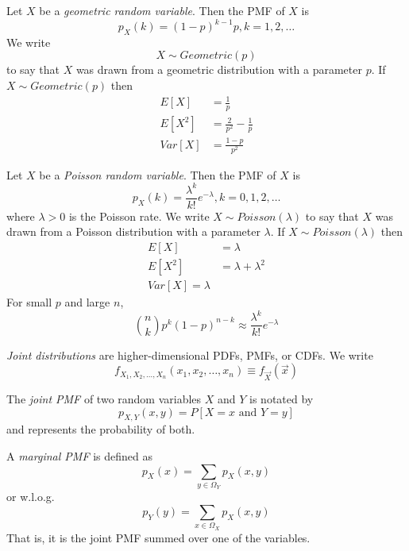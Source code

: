 Let $X$ be a \emph{geometric random variable}. Then the
PMF of $X$ is
\begin{equation}
    p_X(k) = (1 - p)^{k - 1}p, k=1,2,\dots
\end{equation}
We write
\begin{equation}
    X \sim Geometric(p)
\end{equation}
to say that $X$ was drawn from a geometric
distribution with a parameter $p$.
If $X \sim Geometric(p)$ then
\begin{align}
    E[X]   & = \frac{1}{p}                 \\
    E[X^2] & = \frac{2}{p^2} - \frac{1}{p} \\
    Var[X] & = \frac{1 - p}{p^2}
\end{align}

Let $X$ be a \emph{Poisson random variable}. Then the PMF
of $X$ is
\begin{equation}
    p_X(k) = \frac{\lambda^k}{k!}e^{-\lambda}, k=0, 1, 2,\dots
\end{equation}
where $\lambda > 0$ is the Poisson rate. We write
$X \sim Poisson(\lambda)$ to say that $X$ was drawn from
a Poisson distribution with a parameter $\lambda$.
If $X \sim Poisson(\lambda)$ then
\begin{align}
    E[X]   & = \lambda             \\
    E[X^2] & = \lambda + \lambda^2 \\
    Var[X] = \lambda
\end{align}
For small $p$ and large $n$,
\begin{equation}
    {n\choose k}p^k(1-p)^{n-k} \approx \frac{\lambda^k}{k!}e^{-\lambda}
\end{equation}

\emph{Joint distributions} are higher-dimensional
PDFs, PMFs, or CDFs. We write
\begin{equation}
    f_{X_1, X_2, \dots, X_n}(x_1, x_2, \dots, x_n) \equiv f_{\vec{X}}(\vec{x})
\end{equation}

The \emph{joint PMF} of two random variables
$X$ and $Y$ is notated by
\begin{equation}
    p_{X,Y}(x,y)=P[X=x \text{ and } Y=y]
\end{equation}
and represents the probability of both.

A \emph{marginal PMF} is defined as
\begin{equation}
    p_X(x) = \sum_{y\in \Omega_Y} p_X(x,y)
\end{equation}
or w.l.o.g.
\begin{equation}
    p_Y(y) = \sum_{x\in \Omega_X} p_X(x,y)
\end{equation}
That is, it is the joint PMF summed over
one of the variables.

